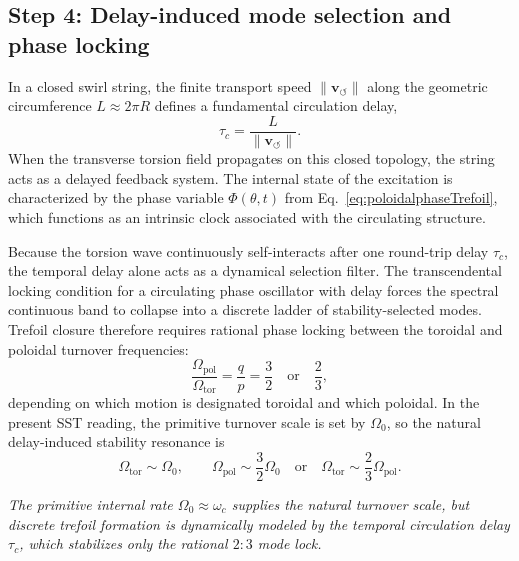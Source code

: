 \documentclass[11pt,a4paper]{article}
\begin{document}
    \subsection{Step 4: Delay-induced mode selection and phase locking}
        In a closed swirl string, the finite transport speed $\lVert \mathbf{v}_{\!\boldsymbol{\circlearrowleft}}\rVert$ along the geometric circumference $L \approx 2\pi R$ defines a fundamental circulation delay,
        \begin{equation}
            \label{eq:CirculationDelay}
            \tau_c = \frac{L}{\lVert \mathbf{v}_{\!\boldsymbol{\circlearrowleft}}\rVert}.
        \end{equation}
        When the transverse torsion field propagates on this closed topology, the string acts as a delayed feedback system. The internal state of the excitation is characterized by the phase variable $\Phi(\theta,t)$ from Eq.~\eqref{eq:poloidalphaseTrefoil}, which functions as an intrinsic clock associated with the circulating structure.
        
        Because the torsion wave continuously self-interacts after one round-trip delay $\tau_c$, the temporal delay alone acts as a dynamical selection filter. The transcendental locking condition for a circulating phase oscillator with delay forces the spectral continuous band to collapse into a discrete ladder of stability-selected modes. Trefoil closure therefore requires rational phase locking between the toroidal and poloidal turnover frequencies:
        \begin{equation}
            \frac{\Omega_{\mathrm{pol}}}{\Omega_{\mathrm{tor}}}
            =
            \frac{q}{p}
            =
            \frac{3}{2}
            \quad\text{or}\quad
            \frac{2}{3},
            \label{eq:trefoilphaselockTrefoil}
        \end{equation}
        depending on which motion is designated toroidal and which poloidal. In the present SST reading, the primitive turnover scale is set by \(\Omega_0\), so the natural delay-induced stability resonance is
        \begin{equation}
            \Omega_{\mathrm{tor}}\sim \Omega_0,
            \qquad
            \Omega_{\mathrm{pol}}\sim \frac{3}{2}\Omega_0
            \quad\text{or}\quad
            \Omega_{\mathrm{tor}}\sim \frac{2}{3}\Omega_{\mathrm{pol}}.
            \label{eq:trefoilOmega0Trefoil}
        \end{equation}
        
        \medskip\noindent\textit{The primitive internal rate $\Omega_0 \approx \omega_c$ supplies the natural turnover scale, but discrete trefoil formation is dynamically modeled by the temporal circulation delay $\tau_c$, which stabilizes only the rational $2{:}3$ mode lock.}
    
\end{document}
